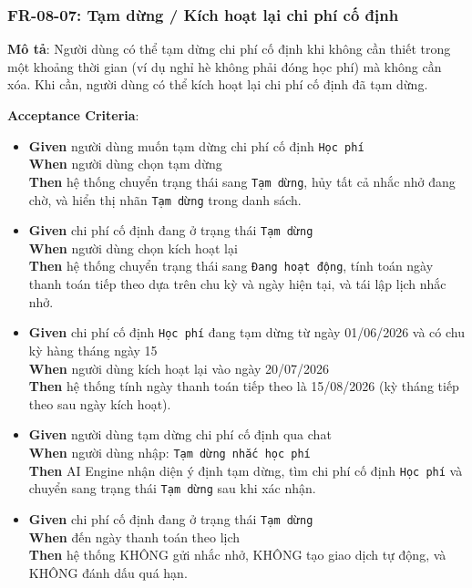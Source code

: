 \subsubsection{FR-08-07: Tạm dừng / Kích hoạt lại chi phí cố định}

\textbf{Mô tả}: Người dùng có thể tạm dừng chi phí cố định khi không cần thiết trong một khoảng thời gian (ví dụ nghỉ hè không phải đóng học phí) mà không cần xóa. Khi cần, người dùng có thể kích hoạt lại chi phí cố định đã tạm dừng.



\textbf{Acceptance Criteria}:

\begin{itemize}
\item \textbf{Given} người dùng muốn tạm dừng chi phí cố định \texttt{Học phí}  \\ \hspace*{1.5em}  \textbf{When} người dùng chọn tạm dừng  \\ \hspace*{1.5em}  \textbf{Then} hệ thống chuyển trạng thái sang \texttt{Tạm dừng}, hủy tất cả nhắc nhở đang chờ, và hiển thị nhãn \texttt{Tạm dừng} trong danh sách.
\item \textbf{Given} chi phí cố định đang ở trạng thái \texttt{Tạm dừng}  \\ \hspace*{1.5em}  \textbf{When} người dùng chọn kích hoạt lại  \\ \hspace*{1.5em}  \textbf{Then} hệ thống chuyển trạng thái sang \texttt{Đang hoạt động}, tính toán ngày thanh toán tiếp theo dựa trên chu kỳ và ngày hiện tại, và tái lập lịch nhắc nhở.
\item \textbf{Given} chi phí cố định \texttt{Học phí} đang tạm dừng từ ngày 01/06/2026 và có chu kỳ hàng tháng ngày 15  \\ \hspace*{1.5em}  \textbf{When} người dùng kích hoạt lại vào ngày 20/07/2026  \\ \hspace*{1.5em}  \textbf{Then} hệ thống tính ngày thanh toán tiếp theo là 15/08/2026 (kỳ tháng tiếp theo sau ngày kích hoạt).
\item \textbf{Given} người dùng tạm dừng chi phí cố định qua chat  \\ \hspace*{1.5em}  \textbf{When} người dùng nhập: \texttt{Tạm dừng nhắc học phí}  \\ \hspace*{1.5em}  \textbf{Then} AI Engine nhận diện ý định tạm dừng, tìm chi phí cố định \texttt{Học phí} và chuyển sang trạng thái \texttt{Tạm dừng} sau khi xác nhận.
\item \textbf{Given} chi phí cố định đang ở trạng thái \texttt{Tạm dừng}  \\ \hspace*{1.5em}  \textbf{When} đến ngày thanh toán theo lịch  \\ \hspace*{1.5em}  \textbf{Then} hệ thống KHÔNG gửi nhắc nhở, KHÔNG tạo giao dịch tự động, và KHÔNG đánh dấu quá hạn.
\end{itemize}
